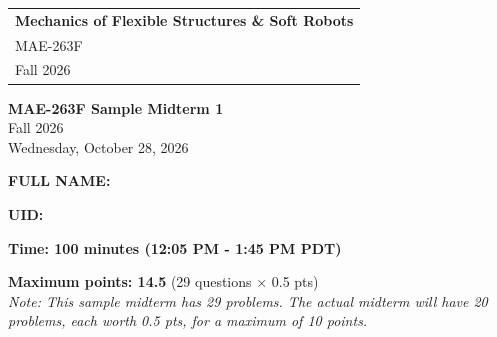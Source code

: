 \documentclass[letterpaper,11pt]{article}
\begin{document}
\thispagestyle{empty}

\begin{tabular}{p{15.5cm}}
{\large \bf Mechanics of Flexible Structures \& Soft Robots} \\
MAE-263F \\ Fall 2026 \\
\hline
\end{tabular}

\vspace*{0.3cm}

\begin{center}
    {\Huge \bf MAE-263F Sample Midterm 1} \\
    \vspace*{0.5cm}
    {\Large Fall 2026} \\
    \vspace*{0.5cm}
    {\Large Wednesday, October 28, 2026}
\end{center}

\vspace*{0.5cm}

{\Large \bf FULL NAME:} \underline{\hspace{10cm}} \\
\vspace*{0.3cm}

{\Large \bf UID:} \underline{\hspace{10cm}}\\
\vspace*{0.3cm}

{\Large \bf Time: 100 minutes (12:05 PM - 1:45 PM PDT)}\\
\vspace*{0.3cm}

{\Large \bf Maximum points: 14.5} \quad (29 questions $\times$ 0.5 pts)\\
\textit{Note: This sample midterm has 29 problems. The actual midterm will have 20 problems, each worth 0.5 pts, for a maximum of 10 points.}

\vspace{0.3cm}
\end{document}
